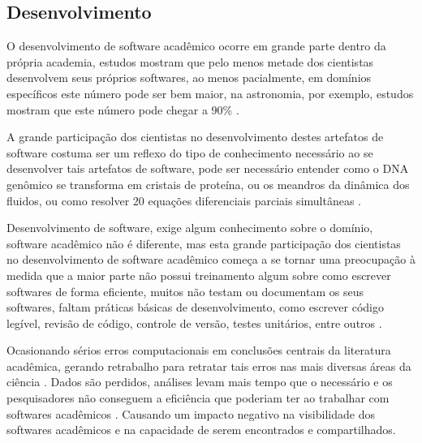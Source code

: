 
\subsection{Desenvolvimento}

O desenvolvimento de software acadêmico ocorre em grande parte dentro da
própria academia, estudos mostram que pelo menos metade dos cientistas desenvolvem
seus próprios softwares, ao menos pacialmente, em domínios específicos este
número pode ser bem maior, na astronomia, por exemplo, estudos mostram que este
número pode chegar a 90\% \cite{hettrick_2014_14809, momcheva2015software}.


A grande participação dos cientistas no desenvolvimento destes artefatos de
software costuma ser um reflexo do tipo de conhecimento necessário ao se
desenvolver tais artefatos de software, pode ser necessário entender como o DNA
genômico se transforma em cristais de proteína, ou os meandros da dinâmica dos
fluidos, ou como resolver 20 equações diferenciais parciais simultâneas
\cite{segal2008developing}.

Desenvolvimento de software, exige algum conhecimento sobre o domínio, software
acadêmico não é diferente, mas esta grande participação dos cientistas no
desenvolvimento de software acadêmico começa a se tornar uma preocupação à
medida que a maior parte não possui treinamento algum sobre como escrever
softwares de forma eficiente, muitos não testam ou documentam os seus
softwares, faltam práticas básicas de desenvolvimento, como escrever código
legível, revisão de código, controle de versão, testes unitários, entre outros
\cite{wilson2017good}.

Ocasionando sérios erros computacionais em conclusões centrais da literatura
acadêmica, gerando retrabalho para retratar tais erros nas mais diversas áreas
da ciência \cite{Merali2010Computational}. Dados são perdidos, análises levam
mais tempo que o necessário e os pesquisadores não conseguem a eficiência que
poderiam ter ao trabalhar com softwares acadêmicos \cite{wilson2017good}.
Causando um impacto negativo na visibilidade dos softwares acadêmicos
\cite{howison2013, katz2014transitive} e na capacidade de serem encontrados e
compartilhados.

